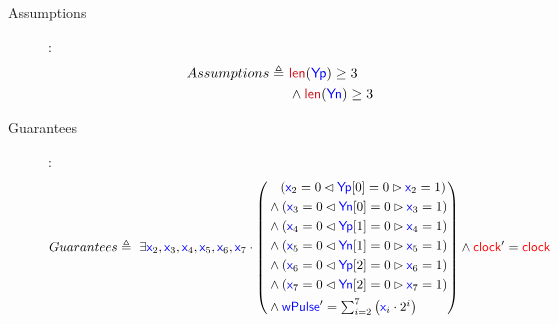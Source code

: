 \documentclass[fleqn,a4paper]{article}
\newcommand\Var[1]{\textcolor{blue}{\textsf{#1}}}
\newcommand\syntax[1]{\textcolor[RGB]{202,12,22}{\textsf{#1}}}
\newcommand\clock{\textcolor{red}{\textsf{clock}}}
\newcommand\definedby{\triangleq}
\begin{document}
\begin{description}
\item[Assumptions]:
\begin{align*}
Assumptions \definedby \
& \syntax{len}(\Var{Yp}) \geq 3 \\
& \wedge \syntax{len}(\Var{Yn}) \geq 3
\end{align*}

\item[Guarantees]:
\begin{align*}
Guarantees \definedby \
\exists \Var{x}_2,\Var{x}_3,\Var{x}_4,\Var{x}_5,\Var{x}_6,\Var{x}_7 \cdot
\left(
\begin{aligned}
& \quad (\Var{x}_2=0\lhd\Var{Yp}[0]=0\rhd \Var{x}_2=1) \\
& \wedge (\Var{x}_3=0\lhd\Var{Yn}[0]=0\rhd \Var{x}_3=1) \\
& \wedge (\Var{x}_4=0\lhd\Var{Yp}[1]=0\rhd \Var{x}_4=1) \\
& \wedge (\Var{x}_5=0\lhd\Var{Yn}[1]=0\rhd \Var{x}_5=1) \\
& \wedge (\Var{x}_6=0\lhd\Var{Yp}[2]=0\rhd \Var{x}_6=1) \\
& \wedge (\Var{x}_7=0\lhd\Var{Yn}[2]=0\rhd \Var{x}_7=1) \\
& \wedge \Var{wPulse}' = \textstyle \sum_{i=2}^7 \big{(}\Var{x}_i \cdot 2^i \big{)} \\
\end{aligned}
\right) \wedge \clock'=\clock
\end{align*}

\end{description}
\end{document}
